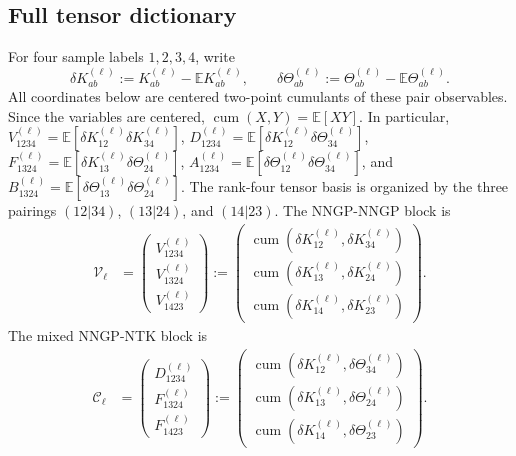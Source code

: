 \documentclass{article}
\newcommand{\E}{\mathbb E}
\newcommand{\cumul}{\operatorname{cum}}
\begin{document}
\subsection{Full tensor dictionary}
\label{app:full-tensor-dictionary}
For four sample labels \(1,2,3,4\), write
\[
\delta K_{ab}^{(\ell)}:=K_{ab}^{(\ell)}-\E K_{ab}^{(\ell)},
\qquad
\delta\Theta_{ab}^{(\ell)}:=\Theta_{ab}^{(\ell)}-\E\Theta_{ab}^{(\ell)}.
\]
All coordinates below are centered two-point cumulants of these pair observables. Since the variables are centered, \(\cumul(X,Y)=\E[XY]\). In particular, \(V_{1234}^{(\ell)}=\E[\delta K_{12}^{(\ell)}\delta K_{34}^{(\ell)}]\), \(D_{1234}^{(\ell)}=\E[\delta K_{12}^{(\ell)}\delta\Theta_{34}^{(\ell)}]\), \(F_{1324}^{(\ell)}=\E[\delta K_{13}^{(\ell)}\delta\Theta_{24}^{(\ell)}]\), \(A_{1234}^{(\ell)}=\E[\delta\Theta_{12}^{(\ell)}\delta\Theta_{34}^{(\ell)}]\), and \(B_{1324}^{(\ell)}=\E[\delta\Theta_{13}^{(\ell)}\delta\Theta_{24}^{(\ell)}]\). The rank-four tensor basis is organized by the three pairings \((12|34)\), \((13|24)\), and \((14|23)\). The NNGP-NNGP block is
\begin{align}
\mathcal V_\ell
&=
\begin{pmatrix}
V_{1234}^{(\ell)}\\
V_{1324}^{(\ell)}\\
V_{1423}^{(\ell)}
\end{pmatrix}
:=
\begin{pmatrix}
\cumul(\delta K_{12}^{(\ell)},\delta K_{34}^{(\ell)})\\
\cumul(\delta K_{13}^{(\ell)},\delta K_{24}^{(\ell)})\\
\cumul(\delta K_{14}^{(\ell)},\delta K_{23}^{(\ell)})
\end{pmatrix}.
\label{eq:V-full-dictionary}
\end{align}
The mixed NNGP-NTK block is
\begin{align}
\mathcal C_\ell
&=
\begin{pmatrix}
D_{1234}^{(\ell)}\\
F_{1324}^{(\ell)}\\
F_{1423}^{(\ell)}
\end{pmatrix}
:=
\begin{pmatrix}
\cumul(\delta K_{12}^{(\ell)},\delta\Theta_{34}^{(\ell)})\\
\cumul(\delta K_{13}^{(\ell)},\delta\Theta_{24}^{(\ell)})\\
\cumul(\delta K_{14}^{(\ell)},\delta\Theta_{23}^{(\ell)})
\end{pmatrix}.
\label{eq:C-full-dictionary}
\end{align}
\end{document}
